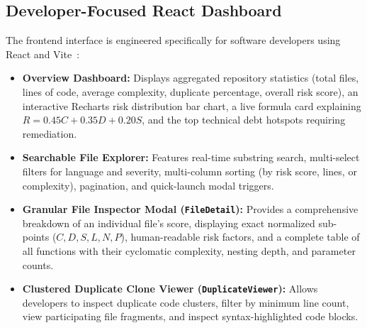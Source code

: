 \subsection{Developer-Focused React Dashboard}
The frontend interface is engineered specifically for software developers using React and Vite~\cite{vite}:
\begin{itemize}
    \item \textbf{Overview Dashboard:} Displays aggregated repository statistics (total files, lines of code, average complexity, duplicate percentage, overall risk score), an interactive Recharts risk distribution bar chart, a live formula card explaining $R = 0.45C + 0.35D + 0.20S$, and the top technical debt hotspots requiring remediation.
    \item \textbf{Searchable File Explorer:} Features real-time substring search, multi-select filters for language and severity, multi-column sorting (by risk score, lines, or complexity), pagination, and quick-launch modal triggers.
    \item \textbf{Granular File Inspector Modal (\texttt{FileDetail}):} Provides a comprehensive breakdown of an individual file's score, displaying exact normalized sub-points ($C, D, S, L, N, P$), human-readable risk factors, and a complete table of all functions with their cyclomatic complexity, nesting depth, and parameter counts.
    \item \textbf{Clustered Duplicate Clone Viewer (\texttt{DuplicateViewer}):} Allows developers to inspect duplicate code clusters, filter by minimum line count, view participating file fragments, and inspect syntax-highlighted code blocks.
\end{itemize}

